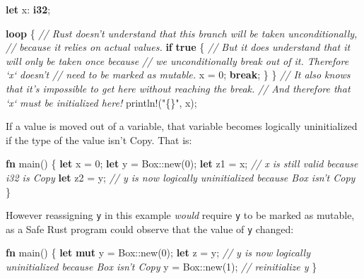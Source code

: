 \documentclass[a4paper,]{book}
\newenvironment{Shaded}{\begin{snugshade}}{\end{snugshade}}
\newcommand{\KeywordTok}[1]{\textcolor[rgb]{0.13,0.29,0.53}{\textbf{{#1}}}}
\newcommand{\DecValTok}[1]{\textcolor[rgb]{0.00,0.00,0.81}{{#1}}}
\newcommand{\StringTok}[1]{\textcolor[rgb]{0.31,0.60,0.02}{{#1}}}
\newcommand{\CommentTok}[1]{\textcolor[rgb]{0.56,0.35,0.01}{\textit{{#1}}}}
\newcommand{\OtherTok}[1]{\textcolor[rgb]{0.56,0.35,0.01}{{#1}}}
\newcommand{\NormalTok}[1]{{#1}}
\begin{document}
\begin{Shaded}
\begin{Highlighting}[]
\KeywordTok{let} \NormalTok{x: }\KeywordTok{i32}\NormalTok{;}

\KeywordTok{loop} \NormalTok{\{}
    \CommentTok{// Rust doesn't understand that this branch will be taken unconditionally,}
    \CommentTok{// because it relies on actual values.}
    \KeywordTok{if} \KeywordTok{true} \NormalTok{\{}
        \CommentTok{// But it does understand that it will only be taken once because}
        \CommentTok{// we unconditionally break out of it. Therefore `x` doesn't}
        \CommentTok{// need to be marked as mutable.}
        \NormalTok{x = }\DecValTok{0}\NormalTok{;}
        \KeywordTok{break}\NormalTok{;}
    \NormalTok{\}}
\NormalTok{\}}
\CommentTok{// It also knows that it's impossible to get here without reaching the break.}
\CommentTok{// And therefore that `x` must be initialized here!}
\OtherTok{println!}\NormalTok{(}\StringTok{"\{\}"}\NormalTok{, x);}
\end{Highlighting}
\end{Shaded}

If a value is moved out of a variable, that variable becomes logically
uninitialized if the type of the value isn't Copy. That is:

\begin{Shaded}
\begin{Highlighting}[]
\KeywordTok{fn} \NormalTok{main() \{}
    \KeywordTok{let} \NormalTok{x = }\DecValTok{0}\NormalTok{;}
    \KeywordTok{let} \NormalTok{y = Box::new(}\DecValTok{0}\NormalTok{);}
    \KeywordTok{let} \NormalTok{z1 = x; }\CommentTok{// x is still valid because i32 is Copy}
    \KeywordTok{let} \NormalTok{z2 = y; }\CommentTok{// y is now logically uninitialized because Box isn't Copy}
\NormalTok{\}}
\end{Highlighting}
\end{Shaded}

However reassigning \texttt{y} in this example \emph{would} require
\texttt{y} to be marked as mutable, as a Safe Rust program could observe
that the value of \texttt{y} changed:

\begin{Shaded}
\begin{Highlighting}[]
\KeywordTok{fn} \NormalTok{main() \{}
    \KeywordTok{let} \KeywordTok{mut} \NormalTok{y = Box::new(}\DecValTok{0}\NormalTok{);}
    \KeywordTok{let} \NormalTok{z = y; }\CommentTok{// y is now logically uninitialized because Box isn't Copy}
    \NormalTok{y = Box::new(}\DecValTok{1}\NormalTok{); }\CommentTok{// reinitialize y}
\NormalTok{\}}
\end{Highlighting}
\end{Shaded}
\end{document}
